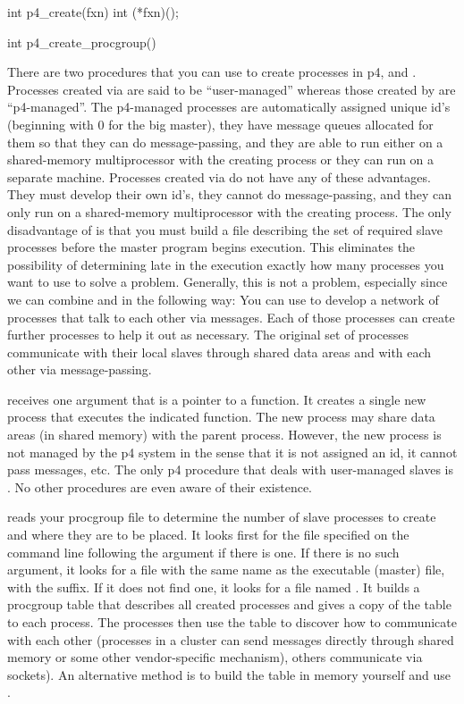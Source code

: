 \begin{example}
int p4_create(fxn)
int (*fxn)();

int p4_create_procgroup()
\end{example}
\noindent
There are two procedures that you can use to create processes in p4,
 and .  Processes created via
 are said to be ``user-managed'' whereas those created
by  are ``p4-managed''.  The p4-managed
processes are automatically assigned unique id's (beginning with 0 for
the big master), they have message queues allocated for them so that
they can do message-passing, and they are able to run either on a
shared-memory multiprocessor with the creating process or they can run
on a separate machine.  Processes created via  do not
have any of these advantages.  They must develop their own id's, they
cannot do message-passing, and they can only run on a shared-memory
multiprocessor with the creating process.  The only disadvantage of
 is that you must build a 
file describing the set of required slave processes before the master
program begins execution.  This eliminates the possibility of
determining late in the execution exactly how many processes you want
to use to solve a problem.  Generally, this is not a problem,
especially since we can combine  and
 in the following way: You can use
 to develop a network of processes that talk
to each other via messages.  Each of those processes can create further
processes to help it out as necessary.  The original set of processes
communicate with their local slaves through shared data areas and with
each other via message-passing.

 receives one argument that is a pointer to a function.  It
creates a single new process that executes the indicated function.  The
new process may share data areas (in shared memory) with the parent
process.  However, the new process is not managed by the p4 system in
the sense that it is not assigned an id, it cannot pass messages, etc.
The only p4 procedure that deals with user-managed slaves is .
No other procedures are even aware of their existence.

 reads your procgroup file to determine the number
of slave processes to create and where they are to be placed.  It looks first
for the file specified on the command line following the  argument
if there is one.  If there is no such argument, it looks for a file with the
same name as the executable (master) file, with the  suffix.  If it
does not find one, it looks for a file named .  It builds a
procgroup table that describes all created processes and gives a copy of the
table to each process.  The processes then use the table to discover how to
communicate with each other (processes in a cluster can send messages directly
through shared memory or some other vendor-specific mechanism), others
communicate via sockets).  An alternative method is to build the table in
memory yourself and use .

